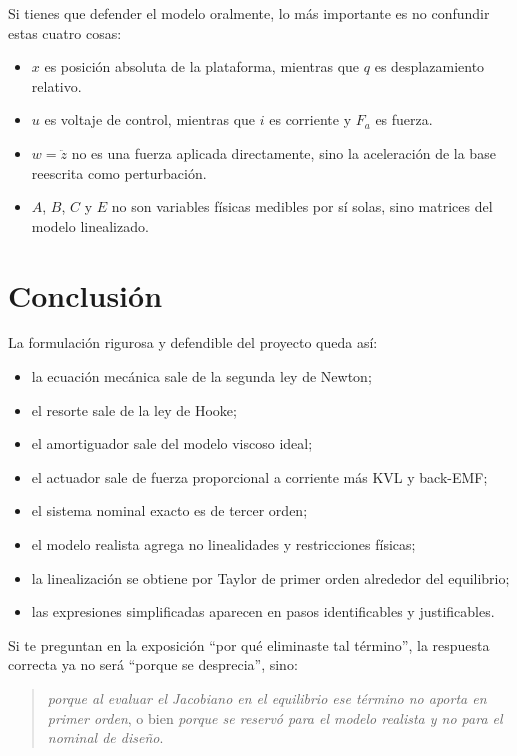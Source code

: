\documentclass[11pt]{article}
\begin{document}
Si tienes que defender el modelo oralmente, lo m\'as importante es no confundir estas cuatro cosas:

\begin{itemize}[leftmargin=1.2cm]
\item $x$ es posici\'on absoluta de la plataforma, mientras que $q$ es desplazamiento relativo.
\item $u$ es voltaje de control, mientras que $i$ es corriente y $F_a$ es fuerza.
\item $w=\ddot z$ no es una fuerza aplicada directamente, sino la aceleraci\'on de la base reescrita como perturbaci\'on.
\item $A$, $B$, $C$ y $E$ no son variables f\'isicas medibles por s\'i solas, sino matrices del modelo linealizado.
\end{itemize}

\section{Conclusi\'on}

La formulaci\'on rigurosa y defendible del proyecto queda as\'i:

\begin{itemize}[leftmargin=1.2cm]
\item la ecuaci\'on mec\'anica sale de la segunda ley de Newton;
\item el resorte sale de la ley de Hooke;
\item el amortiguador sale del modelo viscoso ideal;
\item el actuador sale de fuerza proporcional a corriente m\'as KVL y back-EMF;
\item el sistema nominal exacto es de tercer orden;
\item el modelo realista agrega no linealidades y restricciones f\'isicas;
\item la linealizaci\'on se obtiene por Taylor de primer orden alrededor del equilibrio;
\item las expresiones simplificadas aparecen en pasos identificables y justificables.
\end{itemize}

Si te preguntan en la exposici\'on ``por qu\'e eliminaste tal t\'ermino'', la respuesta correcta ya no ser\'a ``porque se desprecia'', sino:

\begin{quote}
\textit{porque al evaluar el Jacobiano en el equilibrio ese t\'ermino no aporta en primer orden}, o bien \textit{porque se reserv\'o para el modelo realista y no para el nominal de dise\~no}.
\end{quote}
\end{document}
